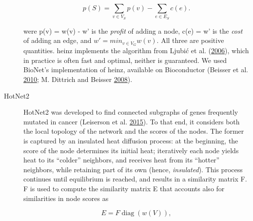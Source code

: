 \documentclass[
  11pt,
]{env/yjiao}
\begin{document}
\begin{description}
\[p(S) = \sum_{v \in V_S} p(v) - \sum_{e \in E_S} c(e).\]

were p(v) = w(v) - w' is the \emph{profit} of adding a node, c(e) = w' is
the \emph{cost} of adding an edge, and \(w' = min_{v \in V_{G}} w(v)\). All
three are positive quantities. heinz implements the algorithm from
Ljubić et al. (\protect\hyperlink{ref-ljubic_algorithmic_2006}{2006}), which in practice is often fast and
optimal, neither is guaranteed. We used BioNet's implementation of
heinz, available on Bioconductor (Beisser et al. \protect\hyperlink{ref-beisser_bionet:_2010}{2010}; M. Dittrich and Beisser \protect\hyperlink{ref-heinz}{2008}).
\item[HotNet2]
HotNet2 was developed to find connected subgraphs of genes
frequently mutated in cancer (Leiserson et al. \protect\hyperlink{ref-leiserson_pan-cancer_2015}{2015}). To that
end, it considers both the local topology of the network and the
scores of the nodes. The former is captured by an insulated heat
diffusion process: at the beginning, the score of the node
determines its initial heat; iteratively each node yields heat to
its ``colder'' neighbors, and receives heat from its ``hotter''
neighbors, while retaining part of its own (hence, \emph{insulated}).
This process continues until equilibrium is reached, and results in
a similarity matrix F. F is used to compute the similarity matrix E
that accounts also for similarities in node scores as

\[E = F \operatorname{diag}(w(V)),\]


\end{description}
\end{document}
